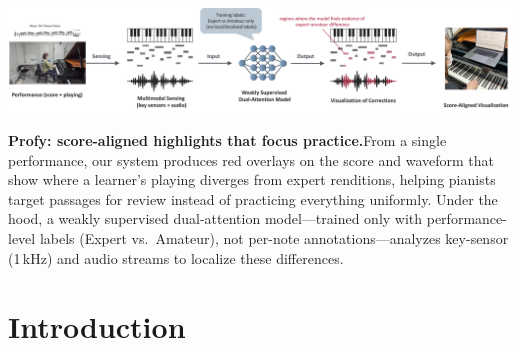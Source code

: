 \documentclass[sigconf,review,anonymous]{acmart}
\begin{document}
\begin{teaserfigure}
\centering
  \includegraphics[width=\textwidth]{figures/teaser.png}
  \caption{\textbf{Profy: score-aligned highlights that focus practice.}From a single performance, our system produces red overlays on the score and waveform that show where a learner's playing diverges from expert renditions, helping pianists target passages for review instead of practicing everything uniformly. Under the hood, a weakly supervised dual-attention model---trained only with performance-level labels (Expert vs.\ Amateur), not per-note annotations---analyzes key-sensor (1\,kHz) and audio streams to localize these differences.}
  \label{fig:teaser}
\end{teaserfigure}

\maketitle

\section{Introduction}
\end{document}
